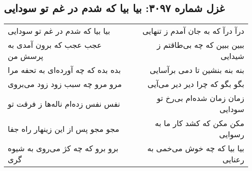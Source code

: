 \begin{center}
\section*{غزل شماره ۳۰۹۷: بیا بیا که شدم در غم تو سودایی}
\label{sec:3097}
\begin{longtable}{l p{0.5cm} r}
بیا بیا که شدم در غم تو سودایی
&&
درآ درآ که به جان آمدم ز تنهایی
\\
عجب عجب که برون آمدی به پرسش من
&&
ببین ببین که چه بی‌طاقتم ز شیدایی
\\
بده بده که چه آورده‌ای به تحفه مرا
&&
بنه بنه بنشین تا دمی برآسایی
\\
مرو مرو چه سبب زود زود می‌بروی
&&
بگو بگو که چرا دیر دیر می‌آیی
\\
نفس نفس زده‌ام ناله‌ها ز فرقت تو
&&
زمان زمان شده‌ام بی‌رخ تو سودایی
\\
مجو مجو پس از این زینهار راه جفا
&&
مکن مکن که کشد کار ما به رسوایی
\\
برو برو که چه کژ می‌روی به شیوه گری
&&
بیا بیا که چه خوش می‌خمی به رعنایی
\\
\end{longtable}
\end{center}
